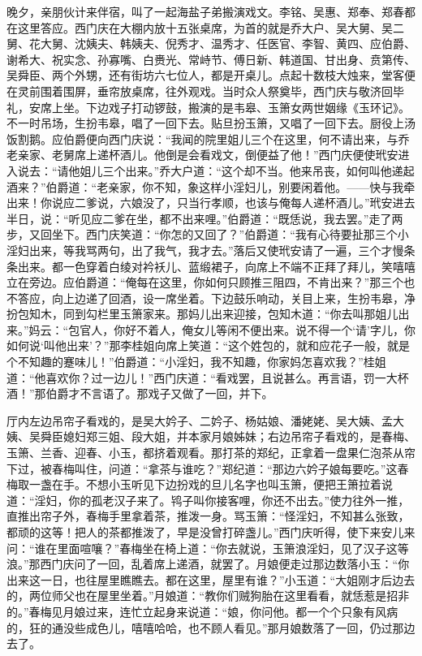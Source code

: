 晚夕，亲朋伙计来伴宿，叫了一起海盐子弟搬演戏文。李铭、吴惠、郑奉、郑春都在这里答应。西门庆在大棚内放十五张桌席，为首的就是乔大户、吴大舅、吴二舅、花大舅、沈姨夫、韩姨夫、倪秀才、温秀才、任医官、李智、黄四、应伯爵、谢希大、祝实念、孙寡嘴、白赉光、常峙节、傅日新、韩道国、甘出身、贲第传、吴舜臣、两个外甥，还有街坊六七位人，都是开桌儿。点起十数枝大烛来，堂客便在灵前围着围屏，垂帘放桌席，往外观戏。当时众人祭奠毕，西门庆与敬济回毕礼，安席上坐。下边戏子打动锣鼓，搬演的是韦皋、玉箫女两世姻缘《玉环记》。不一时吊场，生扮韦皋，唱了一回下去。贴旦扮玉箫，又唱了一回下去。厨役上汤饭割鹅。应伯爵便向西门庆说：“我闻的院里姐儿三个在这里，何不请出来，与乔老亲家、老舅席上递杯酒儿。他倒是会看戏文，倒便益了他！”西门庆便使玳安进入说去：“请他姐儿三个出来。”乔大户道：“这个却不当。他来吊丧，如何叫他递起酒来？”伯爵道：“老亲家，你不知，象这样小淫妇儿，别要闲着他。——快与我牵出来！你说应二爹说，六娘没了，只当行孝顺，也该与俺每人递杯酒儿。”玳安进去半日，说：“听见应二爹在坐，都不出来哩。”伯爵道：“既恁说，我去罢。”走了两步，又回坐下。西门庆笑道：“你怎的又回了？”伯爵道：“我有心待要扯那三个小淫妇出来，等我骂两句，出了我气，我才去。”落后又使玳安请了一遍，三个才慢条条出来。都一色穿着白绫对衿袄儿、蓝缎裙子，向席上不端不正拜了拜儿，笑嘻嘻立在旁边。应伯爵道：“俺每在这里，你如何只顾推三阻四，不肯出来？”那三个也不答应，向上边递了回酒，设一席坐着。下边鼓乐响动，关目上来，生扮韦皋，净扮包知木，同到勾栏里玉箫家来。那妈儿出来迎接，包知木道：“你去叫那姐儿出来。”妈云：“包官人，你好不着人，俺女儿等闲不便出来。说不得一个‘请’字儿，你如何说‘叫他出来’？”那李桂姐向席上笑道：“这个姓包的，就和应花子一般，就是个不知趣的蹇味儿！”伯爵道：“小淫妇，我不知趣，你家妈怎喜欢我？”桂姐道：“他喜欢你？过一边儿！”西门庆道：“看戏罢，且说甚么。再言语，罚一大杯酒！”那伯爵才不言语了。那戏子又做了一回，并下。

厅内左边吊帘子看戏的，是吴大妗子、二妗子、杨姑娘、潘姥姥、吴大姨、孟大姨、吴舜臣媳妇郑三姐、段大姐，并本家月娘姊妹；右边吊帘子看戏的，是春梅、玉箫、兰香、迎春、小玉，都挤着观看。那打茶的郑纪，正拿着一盘果仁泡茶从帘下过，被春梅叫住，问道：“拿茶与谁吃？”郑纪道：“那边六妗子娘每要吃。”这春梅取一盏在手。不想小玉听见下边扮戏的旦儿名字也叫玉箫，便把王箫拉着说道：“淫妇，你的孤老汉子来了。鸨子叫你接客哩，你还不出去。”使力往外一推，直推出帘子外，春梅手里拿着茶，推泼一身。骂玉箫：“怪淫妇，不知甚么张致，都顽的这等！把人的茶都推泼了，早是没曾打碎盏儿。”西门庆听得，使下来安儿来问：“谁在里面喧嚷？”春梅坐在椅上道：“你去就说，玉箫浪淫妇，见了汉子这等浪。”那西门庆问了一回，乱着席上递酒，就罢了。月娘便走过那边数落小玉：“你出来这一日，也往屋里瞧瞧去。都在这里，屋里有谁？”小玉道：“大姐刚才后边去的，两位师父也在屋里坐着。”月娘道：“教你们贼狗胎在这里看看，就恁惹是招非的。”春梅见月娘过来，连忙立起身来说道：“娘，你问他。都一个个只象有风病的，狂的通没些成色儿，嘻嘻哈哈，也不顾人看见。”那月娘数落了一回，仍过那边去了。

